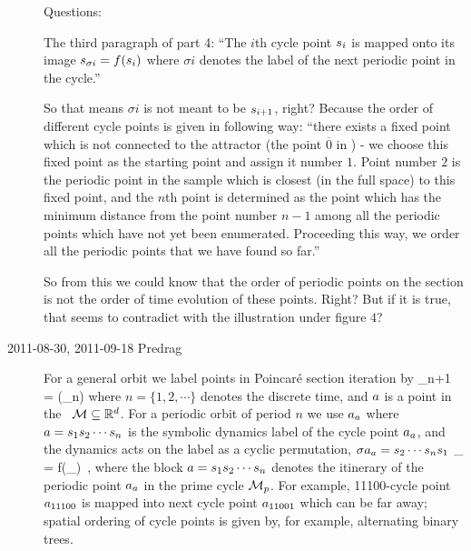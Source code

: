 \begin{description}
Questions:

The third paragraph of part 4:
``The $i$th cycle point  $s_i$ is mapped onto its image $s_{\sigma i} =
f(s_i)$ where $\sigma i$ denotes  the label of the next periodic point in
the cycle.''


So that means $\sigma i$ is not meant to be $s_{i+1}$, right? Because the
order of different cycle points is given in following way: ``there exists
a fixed point which is not connected to the attractor (the point
$\overline{0}$ in ) - we choose this fixed point as the
starting point and assign it number $1$. Point number $2$ is the periodic
point in the sample which is closest (in the full space) to this fixed
point, and the $n$th point is determined as the point which has the
minimum distance from the point number $n-1$ among all the periodic
points which have not yet been enumerated. Proceeding this way, we order
all the periodic points that we have found so far.''

So from this we could know that the order of periodic points on the
section is not the order of time evolution of these points. Right? But if
it is true, that seems to contradict with the illustration under figure
4?

\item[2011-08-30, 2011-09-18 Predrag]                            \toCB
For a general orbit we  label points in Poincar\'e section iteration by
\beq
\ssp_{n+1} = \PoincM(\ssp_n)
where $n=\{1,2,\cdots\}$ denotes the discrete time, and $a$ is a point
in the \statesp\ ${\cal M} \subseteq \mathbb{R}^d$. For a periodic orbit of period
$n$ we use $a_a$ where $a = {s_{1}}{s_{2}}\cdots{\ensuremath{s_{n}}}$ is the
symbolic dynamics label of the cycle point  $a_a$, and the dynamics
acts on the label as a cyclic permutation, $\sigma a_a =
{s_{2}}\cdots{\ensuremath{s_{n}}}{\ensuremath{s_{1}}}$
\beq
\ssp_{\cdots{}} =
    f(\ssp_{\cdots{}})
\,,
where the block $a={s_{1}}{s_{2}}\cdots{\ensuremath{s_{n}}}$ denotes the itinerary
of the periodic point $a_a$ in the prime cycle ${\cal M}_p$. For example,
11100-cycle point $a_{11100}$ is mapped into next cycle point
$a_{11001}$ which can be far away; spatial ordering of cycle points is
given by, for example, alternating binary trees.


\end{description}
